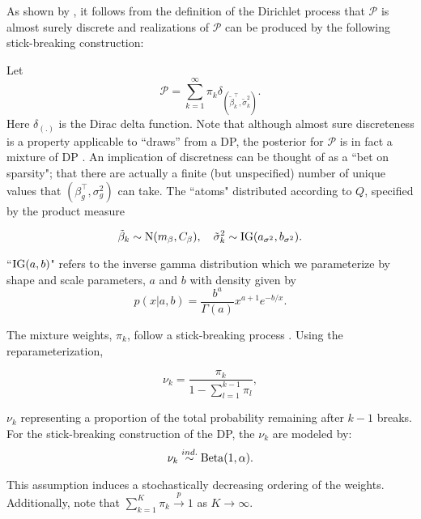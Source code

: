 As shown by \citet{sethuraman}, it follows from the definition of the Dirichlet process that $\mathcal{P}$ is almost surely discrete and realizations of $\mathcal{P}$ can be produced by the following stick-breaking construction:

Let 
\begin{equation}
\mathcal{P} =\sum_{k=1}^\infty \pi_k \delta_{\left(\tilde{\beta}_k^\top ,\tilde{\sigma}^2_k\right)}.
\end{equation}
Here $\delta_{(.)}$ is the Dirac delta function. Note that although almost sure discreteness is a property applicable to ``draws'' from a DP, the posterior for $\mathcal{P}$ is in fact a mixture of DP \citep{antoniak}. An implication of discretness can be thought of as a ``bet on sparsity"; that there are actually a finite (but unspecified) number of unique values that $(\beta_g^\top,\sigma^2_g)$ can take.  
 The ``atoms" distributed according to $Q$, specified by the product measure

\begin{equation}
\tilde{\beta}_k \sim \operatorname{N}(m_\beta, C_\beta),\quad \tilde{\sigma}^2_k \sim \operatorname{IG}(a_{\sigma^2}, b_{\sigma^2}).
\end{equation}

``$\operatorname{IG}(a,b)$" refers to the inverse gamma distribution which we parameterize by shape and scale parameters, $a$ and $b$ with density given by
\begin{equation*}
p(x|a,b) = \frac{b^a}{\Gamma(a)}x^{a+1}e^{-b/x}.
\end{equation*}


The mixture weights, $\pi_k$,  follow a stick-breaking process \cite{sethuraman}. Using the reparameterization,

\begin{equation}
\nu_k = \frac{\pi_k}{1 - \sum_{l=1}^{k-1} \pi_l},
\end{equation}

$\nu_k$ representing a proportion of the total probability remaining after $k-1$ breaks. For the stick-breaking construction of the DP, the $\nu_k$ are modeled by:
\begin{equation}
\nu_k \stackrel{ind.}{\sim} \operatorname{Beta}(1, \alpha).
\end{equation}

This assumption induces a stochastically decreasing ordering of the weights. Additionally, note that $\sum_{k=1}^K \pi_k \stackrel{p}{\rightarrow} 1$ as $K\rightarrow \infty$.

